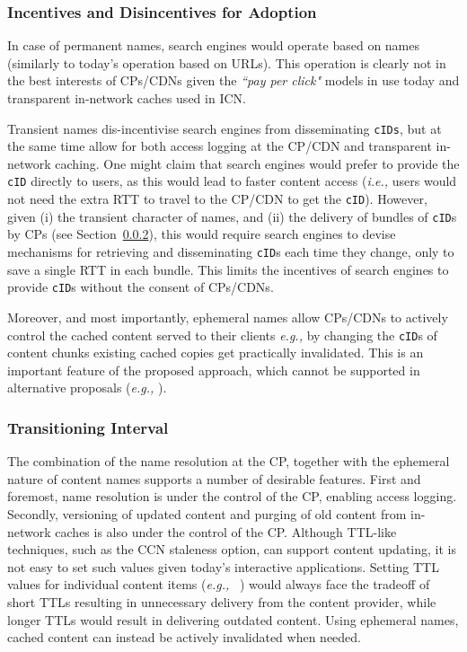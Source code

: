 \documentclass{sig-alternate}
\newcommand{\ie}{{\em i.e.,\/ }}
\newcommand{\eg}{{\em e.g.,\/ }}
\begin{document}
\subsubsection{Incentives and Disincentives for Adoption}


In case of permanent names, search engines would operate based on names (similarly to today's operation based on URLs). This operation is clearly not in the best interests of CPs/CDNs given the \textit{``pay per click"} models in use today and transparent in-network caches used in ICN. 

Transient names dis-incentivise search engines from disseminating \texttt{cIDs}, but at the same time allow for both access logging at the CP/CDN and transparent in-network caching. One might claim that search engines would prefer to provide the \texttt{cID} directly to users, as this would lead to faster content access (\ie users would not need the extra RTT to travel to the CP/CDN to get the \texttt{cID}). However, given (i) the transient character of names, and (ii) the delivery of bundles of \texttt{cID}s by CPs (see Section~\ref{transitioning-interval}), this would require search engines to devise mechanisms for retrieving and disseminating \texttt{cID}s each time they change, only to save a single RTT in each bundle. This limits the incentives of search engines to provide \texttt{cID}s without the consent of CPs/CDNs.

Moreover, and most importantly, ephemeral names allow CPs/CDNs to actively control the cached content served to their clients  \eg by changing the \texttt{cID}s of content chunks existing cached copies get practically invalidated. This is an important feature of the proposed approach, which cannot be supported in alternative proposals (\eg \cite{ccn,netinf,conet}).









\subsubsection{Transitioning Interval}\label{transitioning-interval}

The combination of the name resolution at the CP, together with the ephemeral nature of content names supports a number of desirable features. First and foremost, name resolution is under the control of the CP, enabling access logging. Secondly, versioning of updated content and purging of old content from in-network caches is also under the control of the CP. 
Although TTL-like techniques, such as the CCN staleness option, can support content updating, it is not easy to set such values given today's interactive applications. Setting TTL values for individual content items (\eg~\cite{netifncachecontrol}) would always face the tradeoff of short TTLs resulting in unnecessary delivery from the content provider, while longer TTLs would result in delivering outdated content. Using ephemeral names, cached content can instead be actively invalidated when needed. 
\end{document}
